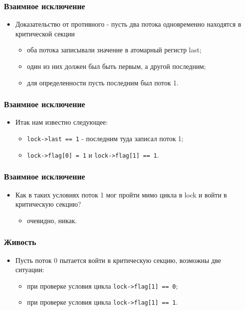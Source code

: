 \begin{frame}
\frametitle{Взаимное исключение}
\begin{itemize}
    \item<1->Доказательство от противного - пусть два потока одновременно
         находятся в критической секции
    \begin{itemize}
        \item<2->оба потока записывали значение в атомарный регистр last;
        \item<3->один из них должен был быть первым, а другой последним;
        \item<4->для определенности пусть последним был поток 1.
    \end{itemize}
\end{itemize}
\end{frame}

\begin{frame}
\frametitle{Взаимное исключение}
\begin{itemize}
    \item<1->Итак нам известно следующее:
    \begin{itemize}
        \item<2->\lstinline|lock->last == 1| - последним туда записал поток 1;
        \item<3->\lstinline|lock->flag[0] = 1| и \lstinline|lock->flag[1] == 1|.
    \end{itemize}
\end{itemize}
\end{frame}

\begin{frame}
\frametitle{Взаимное исключение}
\begin{itemize}
    \item<1->Как в таких условиях поток 1 мог пройти мимо цикла в lock и войти
         в критическую секцию?
    \begin{itemize}
        \item<2->очевидно, никак.
    \end{itemize}
\end{itemize}
\end{frame}

\begin{frame}
\frametitle{Живость}
\begin{itemize}
     \item<1->Пусть поток 0 пытается войти в критическую секцию, возможны две
          ситуации:
     \begin{itemize}
         \item<2->при проверке условия цикла \lstinline|lock->flag[1] == 0|;
         \item<3->при проверке условия цикла \lstinline|lock->flag[1] == 1|.
     \end{itemize}
\end{itemize}
\end{frame}

